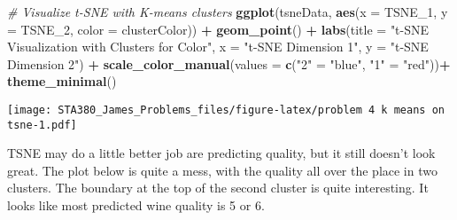 \documentclass[
]{article}
\newenvironment{Shaded}{\begin{snugshade}}{\end{snugshade}}
\newcommand{\AttributeTok}[1]{\textcolor[rgb]{0.13,0.29,0.53}{#1}}
\newcommand{\CommentTok}[1]{\textcolor[rgb]{0.56,0.35,0.01}{\textit{#1}}}
\newcommand{\DecValTok}[1]{\textcolor[rgb]{0.00,0.00,0.81}{#1}}
\newcommand{\FunctionTok}[1]{\textcolor[rgb]{0.13,0.29,0.53}{\textbf{#1}}}
\newcommand{\NormalTok}[1]{#1}
\newcommand{\OtherTok}[1]{\textcolor[rgb]{0.56,0.35,0.01}{#1}}
\newcommand{\SpecialCharTok}[1]{\textcolor[rgb]{0.81,0.36,0.00}{\textbf{#1}}}
\newcommand{\StringTok}[1]{\textcolor[rgb]{0.31,0.60,0.02}{#1}}
\begin{document}
\begin{Shaded}
\begin{Highlighting}[]
\CommentTok{\# Visualize t{-}SNE with K{-}means clusters}
\FunctionTok{ggplot}\NormalTok{(tsneData, }\FunctionTok{aes}\NormalTok{(}\AttributeTok{x =}\NormalTok{ TSNE\_1, }\AttributeTok{y =}\NormalTok{ TSNE\_2, }\AttributeTok{color =}\NormalTok{ clusterColor)) }\SpecialCharTok{+}
  \FunctionTok{geom\_point}\NormalTok{() }\SpecialCharTok{+}
  \FunctionTok{labs}\NormalTok{(}\AttributeTok{title =} \StringTok{"t{-}SNE Visualization with Clusters for Color"}\NormalTok{, }\AttributeTok{x =} \StringTok{"t{-}SNE Dimension 1"}\NormalTok{, }\AttributeTok{y =} \StringTok{"t{-}SNE Dimension 2"}\NormalTok{) }\SpecialCharTok{+}
  \FunctionTok{scale\_color\_manual}\NormalTok{(}\AttributeTok{values =} \FunctionTok{c}\NormalTok{(}\StringTok{"2"} \OtherTok{=} \StringTok{"blue"}\NormalTok{, }\StringTok{"1"} \OtherTok{=} \StringTok{"red"}\NormalTok{))}\SpecialCharTok{+}
  \FunctionTok{theme\_minimal}\NormalTok{()}
\end{Highlighting}
\end{Shaded}

\texttt{[image: STA380\_James\_Problems\_files/figure-latex/problem 4 k means on tsne-1.pdf]}

TSNE may do a little better job are predicting quality, but it still
doesn't look great. The plot below is quite a mess, with the quality all
over the place in two clusters. The boundary at the top of the second
cluster is quite interesting. It looks like most predicted wine quality
is 5 or 6.

\begin{Shaded}
\end{Shaded}
\end{document}
